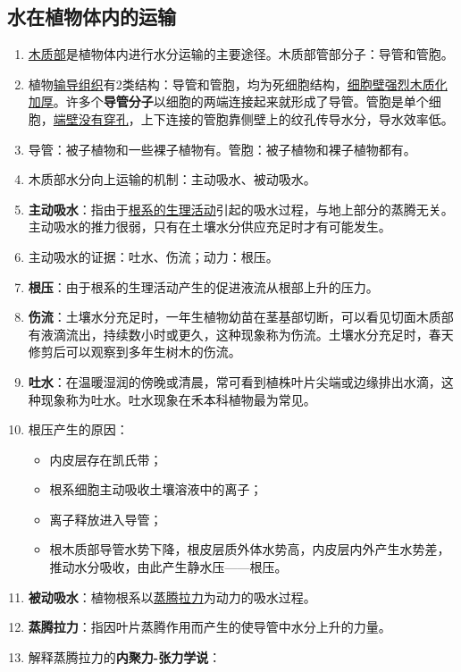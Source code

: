 \subsection{水在植物体内的运输}
\begin{enumerate}
    \item \uline{木质部}是植物体内进行水分运输的主要途径。木质部管部分子：导管和管胞。
    \item 植物\uline{输导组织}有2类结构：导管和管胞，均为死细胞结构，\uline{细胞壁强烈木质化加厚}。许多个\textbf{导管分子}以细胞的两端连接起来就形成了导管。管胞是单个细胞，\uline{端壁没有穿孔}，上下连接的管胞靠侧壁上的纹孔传导水分，导水效率低。
    \item 导管：被子植物和一些裸子植物有。管胞：被子植物和裸子植物都有。
    \item 木质部水分向上运输的机制：主动吸水、被动吸水。
    \item \textbf{主动吸水}：指由于\uline{根系的生理活动}引起的吸水过程，与地上部分的蒸腾无关。主动吸水的推力很弱，只有在土壤水分供应充足时才有可能发生。
    \item 主动吸水的证据：吐水、伤流；动力：根压。
    \item \textbf{根压}：由于根系的生理活动产生的促进液流从根部上升的压力。
    \item \textbf{伤流}：土壤水分充足时，一年生植物幼苗在茎基部切断，可以看见切面木质部有液滴流出，持续数小时或更久，这种现象称为伤流。土壤水分充足时，春天修剪后可以观察到多年生树木的伤流。
    \item \textbf{吐水}：在温暖湿润的傍晚或清晨，常可看到植株叶片尖端或边缘排出水滴，这种现象称为吐水。吐水现象在禾本科植物最为常见。
    \item 根压产生的原因：
    \begin{itemize}
        \item 内皮层存在凯氏带；
        \item 根系细胞主动吸收土壤溶液中的离子；
        \item 离子释放进入导管；
        \item 根木质部导管水势下降，根皮层质外体水势高，内皮层内外产生水势差，推动水分吸收，由此产生静水压——根压。
    \end{itemize}
    \item \textbf{被动吸水}：植物根系以\uline{蒸腾拉力}为动力的吸水过程。
    \item \textbf{蒸腾拉力}：指因叶片蒸腾作用而产生的使导管中水分上升的力量。
    \item 解释蒸腾拉力的\textbf{内聚力-张力学说}：
    \begin{itemize}

\end{itemize}
\end{enumerate}

